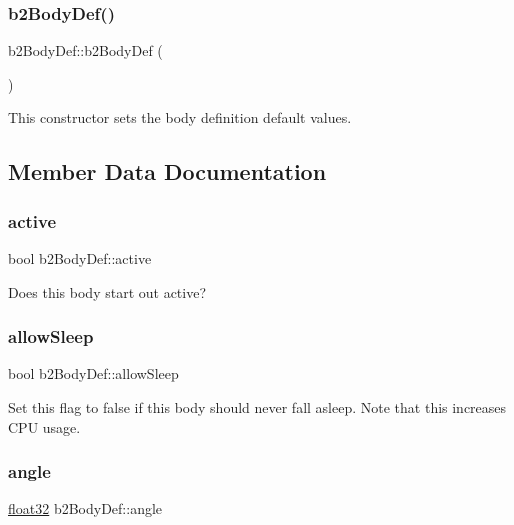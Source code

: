 \subsubsection{\texorpdfstring{b2BodyDef()}{b2BodyDef()}}
{\footnotesize\ttfamily b2\+Body\+Def\+::b2\+Body\+Def (\begin{DoxyParamCaption}{ }\end{DoxyParamCaption})\hspace{0.3cm}{\ttfamily [inline]}}



This constructor sets the body definition default values. 



\subsection{Member Data Documentation}
\mbox{\label{structb2_body_def_adf6f3e9a9e124e080c68bc0edeb170df}} 
\subsubsection{\texorpdfstring{active}{active}}
{\footnotesize\ttfamily bool b2\+Body\+Def\+::active}



Does this body start out active? 

\mbox{\label{structb2_body_def_a0765068172e521ed63cb34084c59c003}} 
\subsubsection{\texorpdfstring{allowSleep}{allowSleep}}
{\footnotesize\ttfamily bool b2\+Body\+Def\+::allow\+Sleep}

Set this flag to false if this body should never fall asleep. Note that this increases C\+PU usage. \mbox{\label{structb2_body_def_a564b16f4f8e9fcb5dda397e64aa9be6f}} 
\subsubsection{\texorpdfstring{angle}{angle}}
{\footnotesize\ttfamily \mbox{\hyperlink{b2_settings_8h_aacdc525d6f7bddb3ae95d5c311bd06a1}{float32}} b2\+Body\+Def\+::angle}



